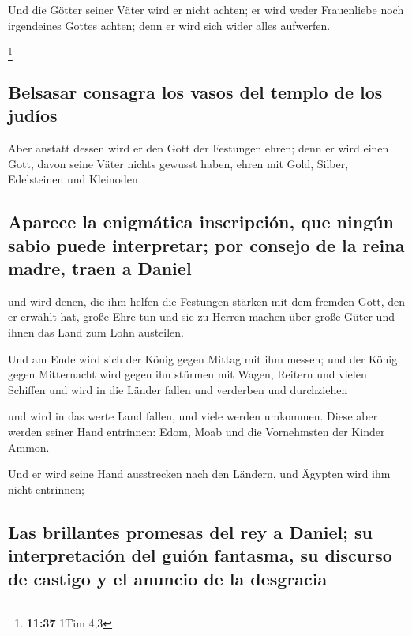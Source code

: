  Und die Götter seiner Väter wird er nicht achten; er
wird weder Frauenliebe noch irgendeines Gottes achten; denn er wird sich
wider alles aufwerfen.

\footnote{\textbf{11:37} 1Tim 4,3}

\hypertarget{belsasar-consagra-los-vasos-del-templo-de-los-juduxedos}{%
\subsection{Belsasar consagra los vasos del templo de los
judíos}\label{belsasar-consagra-los-vasos-del-templo-de-los-juduxedos}}

 Aber anstatt dessen wird er den Gott der Festungen
ehren; denn er wird einen Gott, davon seine Väter nichts gewusst haben,
ehren mit Gold, Silber, Edelsteinen und Kleinoden

\hypertarget{aparece-la-enigmuxe1tica-inscripciuxf3n-que-ninguxfan-sabio-puede-interpretar-por-consejo-de-la-reina-madre-traen-a-daniel}{%
\subsection{Aparece la enigmática inscripción, que ningún sabio puede
interpretar; por consejo de la reina madre, traen a
Daniel}\label{aparece-la-enigmuxe1tica-inscripciuxf3n-que-ninguxfan-sabio-puede-interpretar-por-consejo-de-la-reina-madre-traen-a-daniel}}

 und wird denen, die ihm helfen die Festungen stärken mit
dem fremden Gott, den er erwählt hat, große Ehre tun und sie zu Herren
machen über große Güter und ihnen das Land zum Lohn austeilen.

 Und am Ende wird sich der König gegen Mittag mit ihm
messen; und der König gegen Mitternacht wird gegen ihn stürmen mit
Wagen, Reitern und vielen Schiffen und wird in die Länder fallen und
verderben und durchziehen

 und wird in das werte Land fallen, und viele werden
umkommen. Diese aber werden seiner Hand entrinnen: Edom, Moab und die
Vornehmsten der Kinder Ammon.

 Und er wird seine Hand ausstrecken nach den Ländern, und
Ägypten wird ihm nicht entrinnen;

\hypertarget{las-brillantes-promesas-del-rey-a-daniel-su-interpretaciuxf3n-del-guiuxf3n-fantasma-su-discurso-de-castigo-y-el-anuncio-de-la-desgracia}{%
\subsection{Las brillantes promesas del rey a Daniel; su interpretación
del guión fantasma, su discurso de castigo y el anuncio de la
desgracia}\label{las-brillantes-promesas-del-rey-a-daniel-su-interpretaciuxf3n-del-guiuxf3n-fantasma-su-discurso-de-castigo-y-el-anuncio-de-la-desgracia}}

